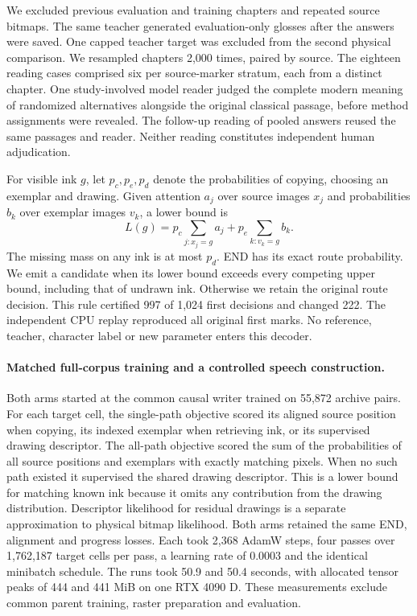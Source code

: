 \documentclass[12pt,a4paper]{article}
\providecommand{\DIFadd}[1]{{\protect\color{blue} \sf #1}} %
\begin{document}
\DIFadd{We excluded previous evaluation and training chapters and repeated source bitmaps. The same teacher generated evaluation-only glosses after the answers were saved. One capped teacher target was excluded from the second physical comparison. We resampled chapters 2,000 times, paired by source. The eighteen reading cases comprised six per source-marker stratum, each from a distinct chapter. One study-involved model reader judged the complete modern meaning of randomized alternatives alongside the original classical passage, before method assignments were revealed. The follow-up reading of pooled answers reused the same passages and reader. Neither reading constitutes independent human adjudication.
}

\DIFadd{For visible ink $g$, let $p_c,p_e,p_d$ denote the probabilities of copying, choosing an exemplar and drawing. Given attention $a_j$ over source images $x_j$ and probabilities $b_k$ over exemplar images $v_k$, a lower bound is
}\[
 L(g)=p_c\sum_{j:x_j=g}a_j+p_e\sum_{k:v_k=g}b_k .
\]
\DIFadd{The missing mass on any ink is at most $p_d$. END has its exact route probability. We emit a candidate when its lower bound exceeds every competing upper bound, including that of undrawn ink. Otherwise we retain the original route decision. This rule certified 997 of 1,024 first decisions and changed 222. The independent CPU replay reproduced all original first marks. No reference, teacher, character label or new parameter enters this decoder.
}

\paragraph{\DIFadd{Matched full-corpus training and a controlled speech construction.}}
\DIFadd{Both arms started at the common causal writer trained on 55,872 archive pairs. For each target cell, the single-path objective scored its aligned source position when copying, its indexed exemplar when retrieving ink, or its supervised drawing descriptor. The all-path objective scored the sum of the probabilities of all source positions and exemplars with exactly matching pixels. When no such path existed it supervised the shared drawing descriptor. This is a lower bound for matching known ink because it omits any contribution from the drawing distribution. Descriptor likelihood for residual drawings is a separate approximation to physical bitmap likelihood. Both arms retained the same END, alignment and progress losses. Each took 2,368 AdamW steps, four passes over 1,762,187 target cells per pass, a learning rate of 0.0003 and the identical minibatch schedule. The runs took 50.9 and 50.4 seconds, with allocated tensor peaks of 444 and 441 MiB on one RTX 4090 D. These measurements exclude common parent training, raster preparation and evaluation.
}
\end{document}
